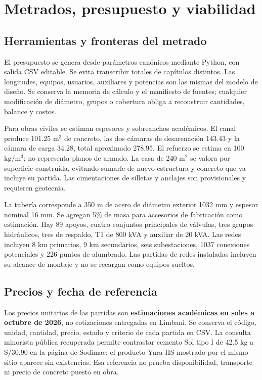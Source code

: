 \chapter{Metrados, presupuesto y viabilidad}
\section{Herramientas y fronteras del metrado}
El presupuesto se genera desde parámetros canónicos mediante Python, con salida CSV editable. Se evita transcribir totales de capítulos distintos. Las longitudes, equipos, usuarios, auxiliares y potencias son las mismas del modelo de diseño. Se conserva la memoria de cálculo y el manifiesto de fuentes; cualquier modificación de diámetro, grupos o cobertura obliga a reconstruir cantidades, balance y costos.

Para obras civiles se estiman espesores y sobreanchos académicos. El canal produce 101.25 \(\mathrm{m^3}\) de concreto, las dos cámaras de desarenación 143.43 y la cámara de carga 34.28, total aproximado 278.95. El refuerzo se estima en 100 \(\mathrm{kg/m^3}\); no representa planos de armado. La casa de 240 \(\mathrm{m^2}\) se valora por superficie construida, evitando sumarle de nuevo estructura y concreto que ya incluye su partida. Las cimentaciones de silletas y anclajes son provisionales y requieren geotecnia.

La tubería corresponde a 350 m de acero de diámetro exterior 1032 mm y espesor nominal 16 mm. Se agregan 5\% de masa para accesorios de fabricación como estimación. Hay 89 apoyos, cuatro conjuntos principales de válvulas, tres grupos hidráulicos, tres de respaldo, T1 de 800 kVA y auxiliar de 20 kVA. Las redes incluyen 8 km primarios, 9 km secundarios, seis subestaciones, 1037 conexiones potenciales y 226 puntos de alumbrado. Las partidas de redes instaladas incluyen su alcance de montaje y no se recargan como equipos sueltos.

\section{Precios y fecha de referencia}
Los precios unitarios de las partidas son \textbf{estimaciones académicas en soles a octubre de 2026}, no cotizaciones entregadas en Limbani. Se conserva el código, unidad, cantidad, precio, estado y criterio de cada partida en CSV. La consulta minorista pública recuperada permite contrastar cemento Sol tipo I de 42.5 kg a S/30.90 en la página de Sodimac; el producto Yura HS mostrado por el mismo sitio aparece sin existencias. Esa referencia no prueba disponibilidad, transporte ni precio de concreto puesto en obra.

